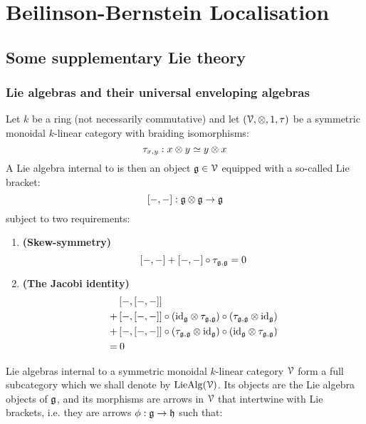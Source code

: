 \section{Beilinson-Bernstein Localisation}
    \subsection{Some supplementary Lie theory}
        \subsubsection{Lie algebras and their universal enveloping algebras}
            \begin{definition} \label{def: lie_algebras}
                Let $k$ be a ring (not necessarily commutative) and let $(\calV, \tensor, 1, \tau)$ be a symmetric monoidal $k$-linear category with braiding isomorphisms:
                    $$\tau_{x, y}: x \tensor y \cong y \tensor x$$
                A Lie algebra internal to is then an object $\mathfrak{g} \in \mathcal{V}$ equipped with a so-called Lie bracket:
                    $$[-,-]: \g \tensor \g \to \g$$
                subject to two requirements:
                    \begin{enumerate}
                        \item \textbf{(Skew-symmetry)}
                            $$[-,-] + [-,-] \circ \tau_{\mathfrak{g}, \mathfrak{g}} = 0$$
                        \item \textbf{(The Jacobi identity)}
                            $$
                                \begin{aligned}
                                    & \left[-, [-,-]\right]
                                    \\
                                    + & \left[-, [-,-]\right] \circ \left(\id_{\g} \tensor \tau_{\g, \g}\right) \circ \left(\tau_{\g, \g} \tensor \id_{\g}\right)
                                    \\
                                    + & \left[-, [-,-]\right] \circ \left(\tau_{\g, \g} \tensor \id_{\g}\right) \circ \left(\id_{\g} \tensor \tau_{\g, \g}\right)
                                    \\
                                    = & \: 0
                                \end{aligned}
                            $$
                    \end{enumerate}
                Lie algebras internal to a symmetric monoidal $k$-linear category $\mathcal{V}$ form a full subcategory which we shall denote by $\mathrm{Lie}\mathrm{Alg}(\mathcal{V})$. Its objects are the Lie algebra objects of $\mathfrak{g}$, and its morphisms are arrows in $\mathcal{V}$ that intertwine with Lie brackets, i.e. they are arrows $\phi: \mathfrak{g} \to \mathfrak{h}$ such that:

\end{definition}

